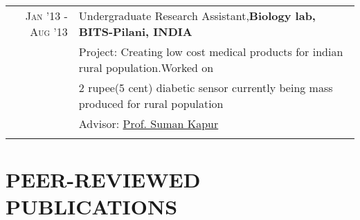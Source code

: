 \documentclass[a4paper,10pt]{article}
\begin{document}
\begin{tabular}{rl}
 \textsc{Jan '13 - Aug '13 } &  Undergraduate Research Assistant,\bf{Biology lab, BITS-Pilani, INDIA}\\
 & Project: Creating low cost medical products for indian rural population.Worked on \\ & 2 rupee(5 cent) diabetic sensor currently being mass produced for rural population\\
&\normalsize \small Advisor: 
\href{http://www.bits-pilani.ac.in/Hyderabad/sumankapur/Profile} {Prof. Suman Kapur}\\&\\

\end{tabular}

\vspace{-4 mm}

\section{PEER-REVIEWED PUBLICATIONS} 


\vspace{-1 mm}
\end{document}
